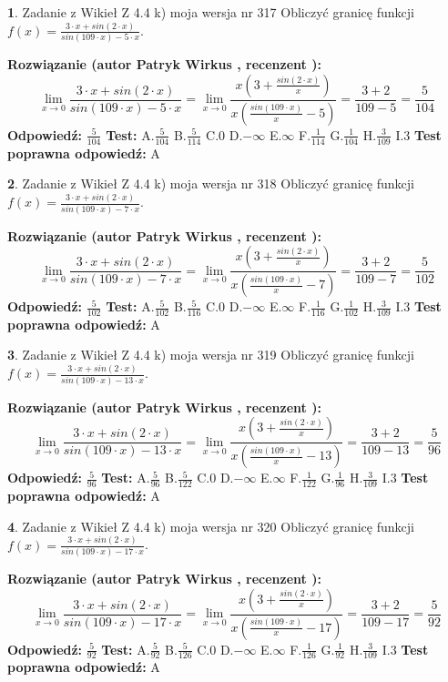 \documentclass[12pt, a4paper]{article}
\theoremstyle{definition} %
\newtheorem{zad}{}
\newcommand{\zadStart}[1]{\begin{zad}#1\newline}
\newcommand{\zadStop}{\end{zad}}
\newcommand{\rozwStart}[2]{\noindent \textbf{Rozwiązanie (autor #1 , recenzent #2): }\newline}
\newcommand{\rozwStop}{\newline}
\newcommand{\odpStart}{\noindent \textbf{Odpowiedź:}\newline}
\newcommand{\odpStop}{\newline}
\newcommand{\testStart}{\noindent \textbf{Test:}\newline}
\newcommand{\testStop}{\newline}
\newcommand{\kluczStart}{\noindent \textbf{Test poprawna odpowiedź:}\newline}
\newcommand{\kluczStop}{\newline}
\begin{document}
\zadStart{Zadanie z Wikieł Z 4.4 k) moja wersja nr 317}
Obliczyć granicę funkcji $f(x)=\frac{3\cdot x +sin(2\cdot x)}{sin(109\cdot x) -5\cdot x}$.
\zadStop
\rozwStart{Patryk Wirkus}{}
$$\lim\limits_{x\to 0}\frac{3\cdot x +sin(2\cdot x)}{sin(109\cdot x) -5\cdot x}
=\lim\limits_{x\to 0}\frac{x(3+\frac{sin(2\cdot x)}{x})}{x(\frac{sin(109\cdot x)}{x}-5)}
=\frac{3+2}{109-5} = \frac{5}{104}$$
\rozwStop
\odpStart
$\frac{5}{104}$
\odpStop
\testStart
A.$\frac{5}{104}$
B.$\frac{5}{114}$
C.$0$
D.$-\infty$
E.$\infty$
F.$\frac{1}{114}$
G.$\frac{1}{104}$
H.$\frac{3}{109}$
I.$3$
\testStop
\kluczStart
A
\kluczStop



\zadStart{Zadanie z Wikieł Z 4.4 k) moja wersja nr 318}
Obliczyć granicę funkcji $f(x)=\frac{3\cdot x +sin(2\cdot x)}{sin(109\cdot x) -7\cdot x}$.
\zadStop
\rozwStart{Patryk Wirkus}{}
$$\lim\limits_{x\to 0}\frac{3\cdot x +sin(2\cdot x)}{sin(109\cdot x) -7\cdot x}
=\lim\limits_{x\to 0}\frac{x(3+\frac{sin(2\cdot x)}{x})}{x(\frac{sin(109\cdot x)}{x}-7)}
=\frac{3+2}{109-7} = \frac{5}{102}$$
\rozwStop
\odpStart
$\frac{5}{102}$
\odpStop
\testStart
A.$\frac{5}{102}$
B.$\frac{5}{116}$
C.$0$
D.$-\infty$
E.$\infty$
F.$\frac{1}{116}$
G.$\frac{1}{102}$
H.$\frac{3}{109}$
I.$3$
\testStop
\kluczStart
A
\kluczStop



\zadStart{Zadanie z Wikieł Z 4.4 k) moja wersja nr 319}
Obliczyć granicę funkcji $f(x)=\frac{3\cdot x +sin(2\cdot x)}{sin(109\cdot x) -13\cdot x}$.
\zadStop
\rozwStart{Patryk Wirkus}{}
$$\lim\limits_{x\to 0}\frac{3\cdot x +sin(2\cdot x)}{sin(109\cdot x) -13\cdot x}
=\lim\limits_{x\to 0}\frac{x(3+\frac{sin(2\cdot x)}{x})}{x(\frac{sin(109\cdot x)}{x}-13)}
=\frac{3+2}{109-13} = \frac{5}{96}$$
\rozwStop
\odpStart
$\frac{5}{96}$
\odpStop
\testStart
A.$\frac{5}{96}$
B.$\frac{5}{122}$
C.$0$
D.$-\infty$
E.$\infty$
F.$\frac{1}{122}$
G.$\frac{1}{96}$
H.$\frac{3}{109}$
I.$3$
\testStop
\kluczStart
A
\kluczStop



\zadStart{Zadanie z Wikieł Z 4.4 k) moja wersja nr 320}
Obliczyć granicę funkcji $f(x)=\frac{3\cdot x +sin(2\cdot x)}{sin(109\cdot x) -17\cdot x}$.
\zadStop
\rozwStart{Patryk Wirkus}{}
$$\lim\limits_{x\to 0}\frac{3\cdot x +sin(2\cdot x)}{sin(109\cdot x) -17\cdot x}
=\lim\limits_{x\to 0}\frac{x(3+\frac{sin(2\cdot x)}{x})}{x(\frac{sin(109\cdot x)}{x}-17)}
=\frac{3+2}{109-17} = \frac{5}{92}$$
\rozwStop
\odpStart
$\frac{5}{92}$
\odpStop
\testStart
A.$\frac{5}{92}$
B.$\frac{5}{126}$
C.$0$
D.$-\infty$
E.$\infty$
F.$\frac{1}{126}$
G.$\frac{1}{92}$
H.$\frac{3}{109}$
I.$3$
\testStop
\kluczStart
A
\kluczStop
\end{document}
